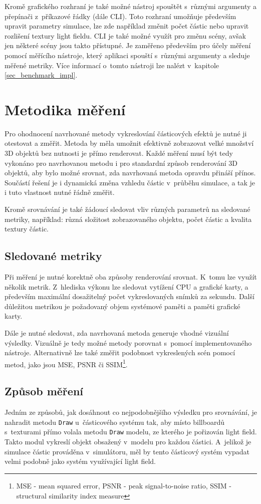 Kromě grafického rozhraní je také možné nástroj spouštět s~různými argumenty a přepínači z~příkazové řádky (dále CLI). Toto rozhraní umožňuje především upravit parametry simulace, lze zde například změnit počet částic nebo upravit rozlišení textury light fieldu. CLI je také možné využít pro změnu scény, avšak jen některé scény jsou takto přístupné. Je zaměřeno především pro účely měření pomocí měřícího nástroje, který aplikaci spouští s~různými argumenty a sleduje měřené metriky. Více informací o~tomto nástroji lze nalézt v~kapitole \ref{sec_benchmark_impl}.    

\section{Metodika měření}
\label{sec:methodology}
Pro ohodnocení navrhované metody vykreslování částicových efektů je nutné ji otestovat a změřit. Metoda by měla umožnit efektivně zobrazovat velké množství 3D objektů bez nutnosti je přímo renderovat. Každé měření musí být tedy vykonáno pro navrhovanou metodu i pro standardní způsob renderování 3D objektů, aby bylo možné srovnat, zda navrhovaná metoda opravdu přináší přínos. Součástí řešení je i dynamická změna vzhledu částic v~průběhu simulace, a tak je i tuto vlastnost nutné řádně změřit.

Kromě srovnávání je také žádoucí sledovat vliv různých parametrů na sledované metriky, například: různá složitost zobrazovaného objektu, počet částic a kvalita textury částic.
\subsection*{Sledované metriky}
Při měření je nutné korektně oba způsoby renderování srovnat. K~tomu lze využít několik metrik. Z~hlediska výkonu lze sledovat vytížení CPU a grafické karty, a především maximální dosažitelný počet vykreslovaných snímků za sekundu. Další důležitou metrikou je požadovaný objem systémové paměti a paměti grafické karty. 

Dále je nutné sledovat, zda navrhovaná metoda generuje vhodné vizuální výsledky. Vizuálně je tedy možné metody porovnat s~pomocí implementovaného nástroje. Alternativně lze také změřit podobnost vykreslených scén pomocí metod, jako jsou MSE, PSNR či SSIM\footnote{MSE - mean squared error, PSNR - peak signal-to-noise ratio, SSIM - structural similarity index measure }.
\subsection*{Způsob měření}
Jedním ze způsobů, jak dosáhnout co nejpodobnějšího výsledku pro srovnávání, je nahradit metodu \texttt{Draw} u~částicového systému tak, aby místo billboardů s~texturami přímo volala metodu \texttt{Draw} modelu, ze kterého je pořizován light field. Takto modul vykreslí objekt obsažený v~modelu pro každou částici. A~jelikož je simulace částic prováděna v~simulátoru, měl by tento částicový systém vypadat velmi podobně jako systém využívající light field. 

